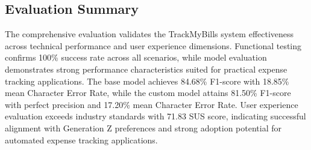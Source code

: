 \subsection{Evaluation Summary}
The comprehensive evaluation validates the TrackMyBills system effectiveness across technical performance and user experience dimensions. Functional testing confirms 100\% success rate across all scenarios, while model evaluation demonstrates strong performance characteristics suited for practical expense tracking applications. The base model achieves 84.68\% F1-score with 18.85\% mean Character Error Rate, while the custom model attains 81.50\% F1-score with perfect precision and 17.20\% mean Character Error Rate. User experience evaluation exceeds industry standards with 71.83 SUS score, indicating successful alignment with Generation Z preferences and strong adoption potential for automated expense tracking applications.